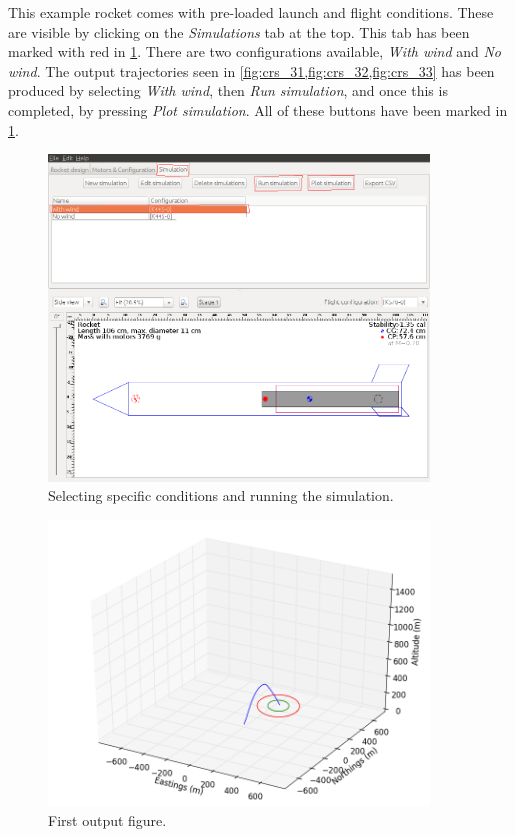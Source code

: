 \documentclass[11pt, a4paper]{article}
\begin{document}
This example rocket comes with pre-loaded launch and flight conditions. These are visible by clicking on the \emph{Simulations} tab at the top. This tab has been marked with red in \cref{fig:crs_2}. There are two configurations available, \emph{With wind} and \emph{No wind}. The output trajectories seen in \cref{fig:crs_31,fig:crs_32,fig:crs_33} has been produced by selecting \emph{With wind}, then \emph{Run simulation}, and once this is completed, by pressing \emph{Plot simulation}. All of these buttons have been marked in \cref{fig:crs_2}.

\begin{figure}
  \centering
    \includegraphics[width=0.9\textwidth]{crs_2_select_simulation.png}
  \caption{Selecting specific conditions and running the simulation.}
  \label{fig:crs_2}
\end{figure}

\begin{figure}
  \centering
    \includegraphics[width=0.9\textwidth]{crs_3_output_1.png}
  \caption{First output figure.}
  \label{fig:crs_31}
\end{figure}
\end{document}
